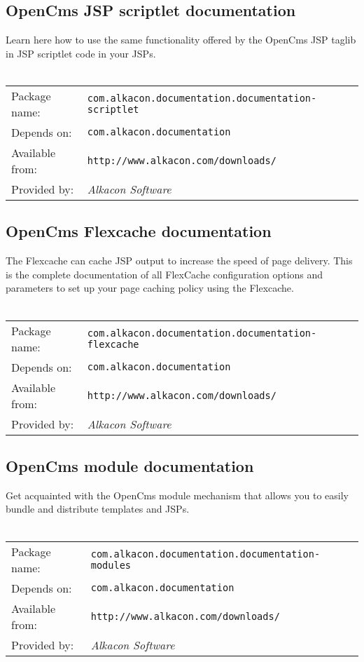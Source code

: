 \subsection{OpenCms JSP scriptlet documentation}
Learn here how to use the same functionality offered by the OpenCms JSP taglib in JSP scriptlet 
code in your JSPs.
\\
\\
\begin{tabular}{ll}
Package name: & {\tt com.alkacon.documentation.documentation-scriptlet}\\
Depends on: & {\tt com.alkacon.documentation}\\
Available from: & {\tt http://www.alkacon.com/downloads/}\\
Provided by: & {\em Alkacon Software}\\
\end{tabular}

\subsection{OpenCms Flexcache documentation}
The Flexcache can cache JSP output to increase the speed of page delivery. This is the complete 
documentation of all FlexCache configuration options and parameters to set up your page caching 
policy using the Flexcache.
\\
\\
\begin{tabular}{ll}
Package name: & {\tt com.alkacon.documentation.documentation-flexcache}\\
Depends on: & {\tt com.alkacon.documentation}\\
Available from: & {\tt http://www.alkacon.com/downloads/}\\
Provided by: & {\em Alkacon Software}\\
\end{tabular}

\subsection{OpenCms module documentation}
Get acquainted with the OpenCms module mechanism that allows you to easily bundle and distribute 
templates and JSPs.
\\
\\
\begin{tabular}{ll}
Package name: & {\tt com.alkacon.documentation.documentation-modules}\\
Depends on: & {\tt com.alkacon.documentation}\\
Available from: & {\tt http://www.alkacon.com/downloads/}\\
Provided by: & {\em Alkacon Software}\\
\end{tabular}

